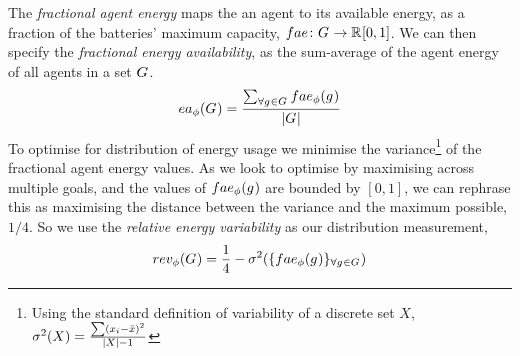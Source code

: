 \newcommand{\functionEnergyAvailable}[2]{
	\ifx \\#1\\
	\functionSignature{ea_{\varTime{}{}}}{\setAgents{}{}}
	\else
	\functionSignature{ea_{\varTime{}{}}}{#1}
	\fi
}
The \textit{fractional agent energy} maps the an agent to its available energy, as a fraction of the batteries' maximum capacity, $\formalAgentEnergyAvailable{}{}$. We can then specify the \textit{fractional energy availability}, as the sum-average of the agent energy of all agents in a set $G_{}^{}$.
\begin{equation}
	\functionEnergyAvailable{}{} 
	= \dfrac{\sum_{\forall \varAgent{}{} \in \setAgents{}{}} \functionAgentEnergyAvailable{\varAgent{i}{}}{}}
	{\funcSize{\setAgents{}{}}}
\end{equation}
To optimise for distribution of energy usage we minimise the variance\footnote{Using the standard definition of variability of a discrete set $X$, $\sigma^2(X) = \frac{\sum (x_i - \bar{x})^2}{\lvert X \rvert-1}$} of the fractional agent energy values. As we look to optimise by maximising across multiple goals, and the values of $\functionAgentEnergyAvailable{}{}$ are bounded by $[0, 1]$, we can rephrase this as maximising the distance between the variance and the maximum possible, $1/4$. So we use the \textit{relative energy variability} as our distribution measurement,
\begin{equation}     	
	\functionEnergyVariability{}{} 
	= \frac{1}{4} - \sigma^2(
	\lbrace \functionAgentEnergyAvailable{}{}
	\rbrace_{\forall \varAgent{}{} \in \setAgents{}{}}
	)
\end{equation}


